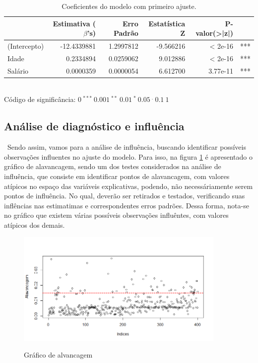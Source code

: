 \documentclass[a4paper]{article}
\begin{document}
\begin{table}[H] 
\caption{Coeficientes do modelo com primeiro ajuste.}
\begin{center}
\begin{tabular}{lrrrrl}
\hline
  & Estimativa ($\beta$'s) & Erro Padrão & Estatística Z & P-valor(>|z|)\\
\hline
(Intercepto) & -12.4339881 & 1.2997812 & -9.566216 & < 2e-16 & ***\\
Idade & 0.2334894 & 0.0259062 & 9.012886 & < 2e-16 & ***\\
Salário & 0.0000359 & 0.0000054 & 6.612700 & 3.77e-11 & ***\\
\hline
\end{tabular}
\\\tiny{\hspace{-5cm} Código de significância: $0\ ^{***}\ 0.001\ ^{**}\ 0.01\ ^{*}\ 0.05\ ^{.}\ 0.1 \ 1$}
\label{tab4}
\end{center}
\end{table}

\subsection{Análise de diagnóstico e influência}
\quad \ Sendo assim, vamos para a análise de influência,  buscando identificar possíveis observações influentes no ajuste do modelo. Para isso, na figura \ref{fig:alav1} é apresentado o gráfico de alavancagem, sendo um dos testes considerados na análise de influência, que consiste em identificar pontos de alavancagem, com valores atípicos no espaço das variáveis explicativas, podendo, não necessáriamente serem pontos de influência. No qual, deverão ser retirados e testados, verificando suas inflências nas estimatimas e correspondentes erros padrões. Dessa forma, nota-se no gráfico que existem várias possíveis observações influêntes, com valores atípicos dos demais.


\begin{figure}[H] 
    \centering %
    \caption{Gráfico de alvancagem}
    \includegraphics[width=0.9\textwidth]{imagens/Alav1.png}
    \label{fig:alav1}
\end{figure}
\end{document}
